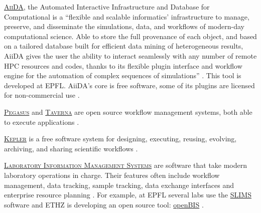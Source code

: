 \vspace{0.4cm}

\noindent {}  \textsc{\href{http://www.aiida.net/}{AiiDA}}, the Automated Interactive Infrastructure and Database for Computational is a ``flexible and scalable informatics' infrastructure to manage, preserve, and disseminate the simulations, data, and workflows of modern-day computational science. Able to store the full provenance of each object, and based on a tailored database built for efficient data mining of heterogeneous results, AiiDA gives the user the ability to interact seamlessly with any number of remote HPC resources and codes, thanks to its flexible plugin interface and workflow engine for the automation of complex sequences of simulations'' \cite{aiida.net_aiida_2015}. This tool is developed at EPFL. AiiDA's core is free software, some of its plugins are licensed for non-commercial use \cite{pizzi_aiida:_2015}.

\vspace{0.4cm}

\noindent {}  \textsc{\href{http://pegasus.isi.edu/}{Pegasus}} and \textsc{\href{http://www.taverna.org.uk/}{Taverna}} are open source workflow management systems, both able to execute applications \cite{pegasus_pegasus_2015,taverna_taverna_2015}.

\vspace{0.4cm}

\noindent {} \textsc{\href{https://kepler-project.org/}{Kepler}} is a free software system for designing, executing, reusing, evolving, archiving, and sharing scientific workflows \cite{kepler-project.org_kepler_2015,kepler-project.org_kepler_2015-1}.

\vspace{0.4cm}

\noindent {}   \textsc{\href{https://en.wikipedia.org/wiki/Laboratory_information_management_system}{Laboratory Information Management Systems}} are software that take modern laboratory operations in charge. Their features often include workflow management, data tracking, sample tracking, data exchange interfaces and enterprise resource planning \cite{wikipedia_laboratory_2015}. For example, at EPFL several labs use the \href{http://sv-it.epfl.ch/slims}{SLIMS} software and ETHZ is developing an open source tool: \href{http://www.cisd.ethz.ch/software/openBIS}{openBIS} \cite{ethz_eth_2015,epfl_lsis_2015}.


